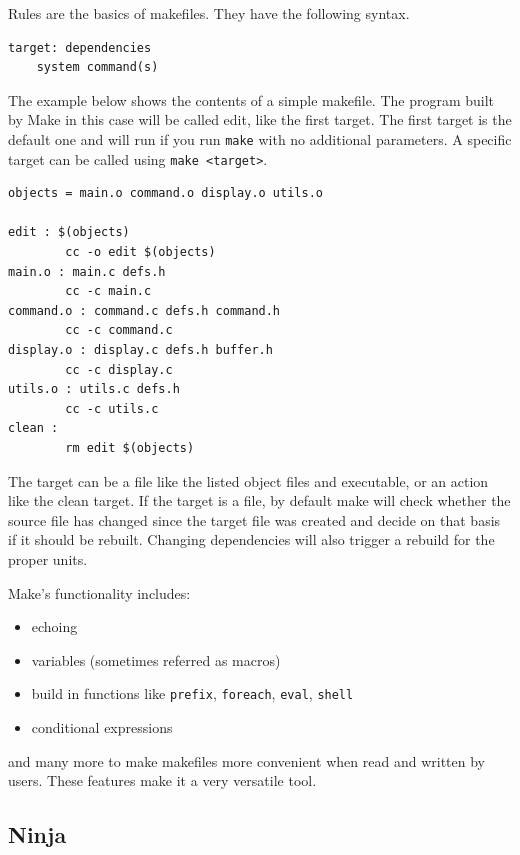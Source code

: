 Rules are the basics of makefiles. They have the following syntax.

\begin{verbatim}
target: dependencies
    system command(s)
\end{verbatim}

The example below shows the contents of a simple makefile. The program
built by Make in this case will be called edit, like the first target.
The first target is the default one and will run if you run
\texttt{make} with no additional parameters. A specific target can be
called using \texttt{make\ \textless{}target\textgreater{}}.

\begin{lstlisting}[caption={%
  Example of simple MakeFile \cite{MAKEFILE}%
}]
objects = main.o command.o display.o utils.o

edit : $(objects)
        cc -o edit $(objects)
main.o : main.c defs.h
        cc -c main.c
command.o : command.c defs.h command.h
        cc -c command.c
display.o : display.c defs.h buffer.h
        cc -c display.c
utils.o : utils.c defs.h
        cc -c utils.c
clean :
        rm edit $(objects)
\end{lstlisting}

The target can be a file like the listed object files and executable, or
an action like the clean target. If the target is a file, by default
make will check whether the source file has changed since the target
file was created and decide on that basis if it should be rebuilt.
Changing dependencies will also trigger a rebuild for the proper units.

Make's functionality includes:

\begin{itemize}
\item
  echoing
\item
  variables (sometimes referred as macros)
\item
  build in functions like \texttt{prefix}, \texttt{foreach},
  \texttt{eval}, \texttt{shell}
\item
  conditional expressions
\end{itemize}

and many more to make makefiles more convenient when read and written by
users. These features make it a very versatile tool.

\hypertarget{ninja}{%
\subsection{Ninja}\label{ninja}}

